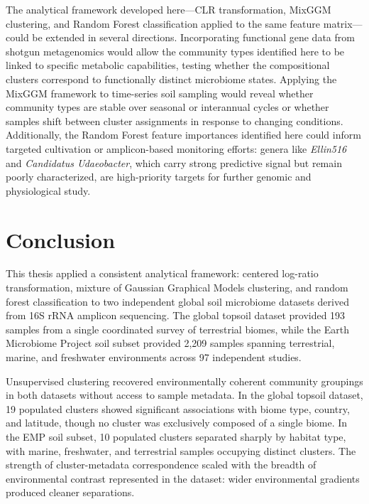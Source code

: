 \documentclass[12pt, oneside]{report}
\begin{document}
The analytical framework developed here---CLR transformation, MixGGM clustering, and
Random Forest classification applied to the same feature matrix---could be extended in
several directions. Incorporating functional gene data from shotgun metagenomics would
allow the community types identified here to be linked to specific metabolic capabilities,
testing whether the compositional clusters correspond to functionally distinct microbiome
states. Applying the MixGGM framework to time-series soil sampling would reveal whether
community types are stable over seasonal or interannual cycles or whether samples shift
between cluster assignments in response to changing conditions. Additionally, the Random
Forest feature importances identified here could inform targeted cultivation or
amplicon-based monitoring efforts: genera like \textit{Ellin516} and
\textit{Candidatus Udaeobacter}, which carry strong predictive signal but remain poorly
characterized, are high-priority targets for further genomic and physiological study.

\chapter{Conclusion}

This thesis applied a consistent analytical framework: centered log-ratio transformation, mixture of Gaussian Graphical Models clustering, and random forest classification to two independent global soil microbiome datasets derived from 16S rRNA amplicon sequencing. The global topsoil dataset\cite{bahram2018} provided 193 samples from a single coordinated survey of terrestrial biomes, while the Earth Microbiome Project soil subset\cite{thompson2017} provided 2,209 samples spanning terrestrial, marine, and freshwater environments across 97 independent studies.

Unsupervised clustering recovered environmentally coherent community groupings in both datasets without access to sample metadata. In the global topsoil dataset, 19 populated clusters showed significant associations with biome type, country, and latitude, though no cluster was exclusively composed of a single biome. In the EMP soil subset, 10 populated clusters separated sharply by habitat type, with marine, freshwater, and terrestrial samples occupying distinct clusters. The strength of cluster-metadata correspondence scaled with the breadth of environmental contrast represented in the dataset: wider environmental gradients produced cleaner separations.
\end{document}
